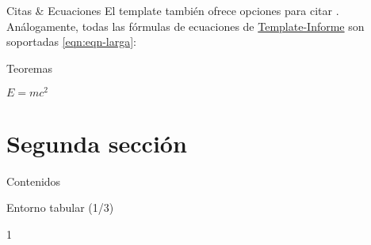 
\begin{frame}{Citas \& Ecuaciones}
	El template también ofrece opciones para citar \cite{template}. Análogamente, todas las fórmulas de ecuaciones de \href{https://latex.ppizarror.com/informe}{Template-Informe} son soportadas \eqref{eqn:eqn-larga}:
	
\end{frame}


\begin{frame}{Teoremas}
	\begin{theorem}
		$E = mc^2$
	\end{theorem}
\end{frame}


\section{Segunda sección}

\begin{frame}{Contenidos}
	\tableofcontentscurrent
\end{frame}



\begin{frame}{Entorno tabular (1/3)}
	\begin{tabularframehead}{1}
	\end{tabularframehead}
\end{frame}

